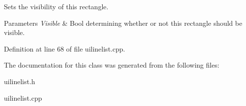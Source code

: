 Sets the visibility of this rectangle. 


\begin{DoxyParams}{Parameters}
{\em Visible} & Bool determining whether or not this rectangle should be visible. \\
\hline
\end{DoxyParams}


Definition at line 68 of file uilinelist.cpp.



The documentation for this class was generated from the following files:\begin{DoxyCompactItemize}
\item 
uilinelist.h\item 
uilinelist.cpp\end{DoxyCompactItemize}
